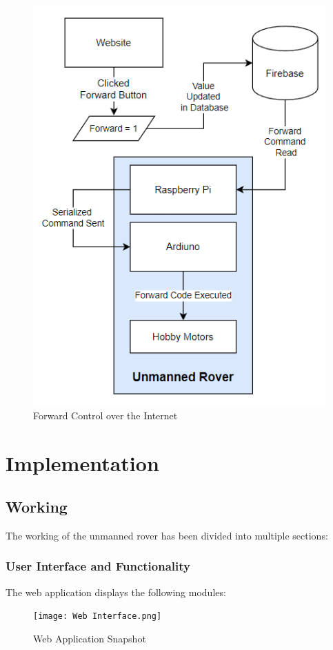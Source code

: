 \documentclass[conference,a4paper]{IEEEtran}
\begin{document}
\begin{figure}[ht]
\centering
\includegraphics[width=1\linewidth]{controller.png}
\caption{Forward Control over the Internet}
\label{Fig: Control}
\end{figure}

\section{Implementation}

\subsection{Working}
The working of the unmanned rover has been divided into multiple sections:

\subsubsection{User Interface and Functionality}
The web application displays the following modules:
\begin{figure}[ht]
\centering
\texttt{[image: Web Interface.png]}
\caption{Web Application Snapshot}
\label{Fig: Web}
\end{figure}
\end{document}
